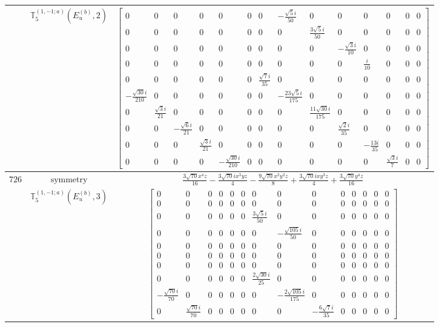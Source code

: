 \documentclass[fleqn,8pt,landscape]{jsarticle}
\begin{document}
\begin{longtable}{ccc}
$  $ & $ \mathbb{T}_{5}^{(1,-1;a)}(E_{u}^{(b)},2) $ & $ \begin{bmatrix} 0 & 0 & 0 & 0 & 0 & 0 & 0 & - \frac{\sqrt{5} i}{50} & 0 & 0 & 0 & 0 & 0 & 0 \\ 0 & 0 & 0 & 0 & 0 & 0 & 0 & 0 & \frac{3 \sqrt{5} i}{50} & 0 & 0 & 0 & 0 & 0 \\ 0 & 0 & 0 & 0 & 0 & 0 & 0 & 0 & 0 & - \frac{\sqrt{3} i}{10} & 0 & 0 & 0 & 0 \\ 0 & 0 & 0 & 0 & 0 & 0 & 0 & 0 & 0 & 0 & \frac{i}{10} & 0 & 0 & 0 \\ 0 & 0 & 0 & 0 & 0 & 0 & \frac{\sqrt{7} i}{35} & 0 & 0 & 0 & 0 & 0 & 0 & 0 \\ - \frac{\sqrt{30} i}{210} & 0 & 0 & 0 & 0 & 0 & 0 & - \frac{23 \sqrt{5} i}{175} & 0 & 0 & 0 & 0 & 0 & 0 \\ 0 & \frac{\sqrt{3} i}{21} & 0 & 0 & 0 & 0 & 0 & 0 & \frac{11 \sqrt{30} i}{175} & 0 & 0 & 0 & 0 & 0 \\ 0 & 0 & - \frac{\sqrt{6} i}{21} & 0 & 0 & 0 & 0 & 0 & 0 & \frac{\sqrt{2} i}{35} & 0 & 0 & 0 & 0 \\ 0 & 0 & 0 & \frac{\sqrt{3} i}{21} & 0 & 0 & 0 & 0 & 0 & 0 & - \frac{13 i}{35} & 0 & 0 & 0 \\ 0 & 0 & 0 & 0 & - \frac{\sqrt{30} i}{210} & 0 & 0 & 0 & 0 & 0 & 0 & \frac{\sqrt{3} i}{7} & 0 & 0 \end{bmatrix} $ \\ \hline
$ 726 $ & $ \text{symmetry} $ & $ \frac{3 \sqrt{70} x^{4} z}{16} - \frac{3 \sqrt{70} i x^{3} y z}{4} - \frac{9 \sqrt{70} x^{2} y^{2} z}{8} + \frac{3 \sqrt{70} i x y^{3} z}{4} + \frac{3 \sqrt{70} y^{4} z}{16} $ \\
$  $ & $ \mathbb{T}_{5}^{(1,-1;a)}(E_{u}^{(b)},3) $ & $ \begin{bmatrix} 0 & 0 & 0 & 0 & 0 & 0 & 0 & 0 & 0 & 0 & 0 & 0 & 0 & 0 \\ 0 & 0 & 0 & 0 & 0 & 0 & 0 & 0 & 0 & 0 & 0 & 0 & 0 & 0 \\ 0 & 0 & 0 & 0 & 0 & 0 & \frac{3 \sqrt{5} i}{50} & 0 & 0 & 0 & 0 & 0 & 0 & 0 \\ 0 & 0 & 0 & 0 & 0 & 0 & 0 & - \frac{\sqrt{105} i}{50} & 0 & 0 & 0 & 0 & 0 & 0 \\ 0 & 0 & 0 & 0 & 0 & 0 & 0 & 0 & 0 & 0 & 0 & 0 & 0 & 0 \\ 0 & 0 & 0 & 0 & 0 & 0 & 0 & 0 & 0 & 0 & 0 & 0 & 0 & 0 \\ 0 & 0 & 0 & 0 & 0 & 0 & 0 & 0 & 0 & 0 & 0 & 0 & 0 & 0 \\ 0 & 0 & 0 & 0 & 0 & 0 & \frac{2 \sqrt{30} i}{25} & 0 & 0 & 0 & 0 & 0 & 0 & 0 \\ - \frac{\sqrt{70} i}{70} & 0 & 0 & 0 & 0 & 0 & 0 & - \frac{2 \sqrt{105} i}{175} & 0 & 0 & 0 & 0 & 0 & 0 \\ 0 & \frac{\sqrt{70} i}{70} & 0 & 0 & 0 & 0 & 0 & 0 & - \frac{6 \sqrt{7} i}{35} & 0 & 0 & 0 & 0 & 0 \end{bmatrix} $ \\ \hline

\end{longtable}
\end{document}
